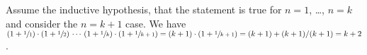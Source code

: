 \documentclass{test}  %
\begin{document}
\begin{problem}
\begin{exes}
\begin{answer}
  Assume the inductive hypothesis, that the statement is true for
  $n=1$, \ldots, $n=k$ and consider the $n=k+1$ case.
  We have
  $(1+\sfrac{1}{1})\cdot(1+\sfrac{1}{2})\,\cdots\,(1+\sfrac{1}{k})\cdot(1+\sfrac{1}{k+1})
  =
  (k+1)\cdot(1+\sfrac{1}{k+1})
  =(k+1)+(k+1)/(k+1)
  =k+2$.  
\end{answer}
\end{exes}



\end{problem}
\end{document}
